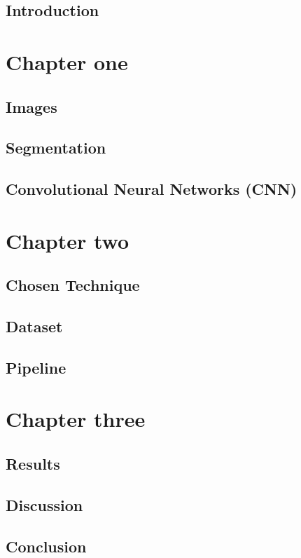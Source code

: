 \documentclass[12pt,a4paper]{report}
\begin{document}
\begin{titlepage}

\end{titlepage}


\clearpage{\pagestyle{empty}\cleardoublepage}
\tableofcontents               
{}


\clearpage{\pagestyle{empty}\cleardoublepage}
\section*{\LARGE{Introduction}}


\chapter{Chapter one}

\section{Images}


\newpage

\section{Segmentation}


\newpage

\section{Convolutional Neural Networks (CNN)}

\chapter{Chapter two}

\section{Chosen Technique}
\section{Dataset}
\section{Pipeline}

\chapter{Chapter three}

\section{Results}
\section{Discussion}

\clearpage{\pagestyle{empty}\cleardoublepage}
\section*{\LARGE{Conclusion}}

\printbibliography[heading=bibintoc,
title={Bibliography}
]
\end{document}
